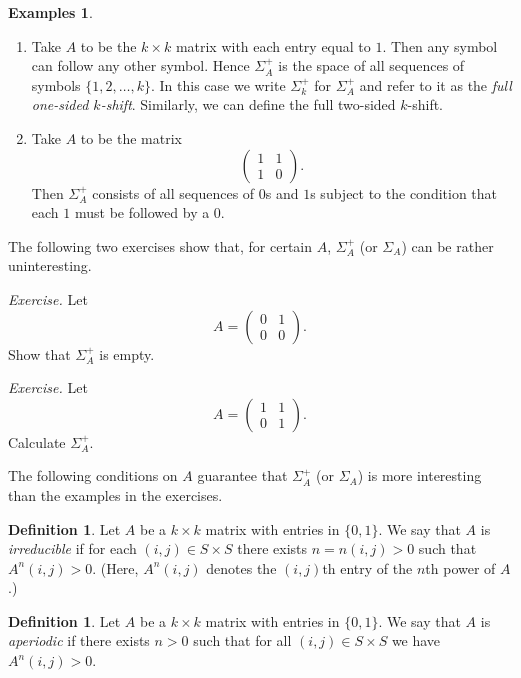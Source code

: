 \documentclass[12pt]{article}
\theoremstyle{definition}
\newtheorem{definition}[theorem]{Definition}
\newtheorem{examples}[theorem]{Examples}
\theoremstyle{remark}
\begin{document}
\begin{examples}
\begin{enumerate}
\item
Take $A$ to be the $k \times k$ matrix with each entry equal to $1$.
Then any symbol can follow any other symbol.  Hence $\Sigma_{A}^{+}$
is the space of all sequences of symbols $\{1,2, \ldots, k\}$.  In
this case we write $\Sigma_{k}^{+}$ for $\Sigma_{A}^{+}$ and refer to
it as the {\it  full one-sided $k$-shift}.  Similarly, we can define
the full two-sided $k$-shift.
\item
Take $A$ to be the matrix
\[
 \left( \begin{array}{cc} 1 & 1 \\ 1 & 0 \end{array} \right).
\]
Then $\Sigma_{A}^{+}$ consists of all sequences of $0$s and $1$s
subject to the condition that each $1$ must be followed by a $0$.
\end{enumerate}
\end{examples}

The following two exercises show that, for certain $A$,
$\Sigma_{A}^{+}$ (or $\Sigma_{A}$) can be rather uninteresting.

\medskip
\noindent
{\it Exercise.}
Let
\[
 A = \left( \begin{array}{cc} 0 & 1 \\ 0 & 0 \end{array} \right).
\]
Show that $\Sigma_{A}^{+}$ is empty.



\medskip
\noindent
{\it Exercise.}
Let
\[
 A = \left( \begin{array}{cc} 1 & 1 \\ 0 & 1 \end{array} \right).
\]
Calculate $\Sigma_{A}^{+}$.

\medskip
The following conditions on $A$ guarantee that $\Sigma_{A}^{+}$ (or
$\Sigma_{A}$) is more interesting than the examples in the exercises.

\begin{definition}
Let $A$ be a $k \times k$ matrix with entries in $\{0,1\}$.  We say
that $A$ is {\it  irreducible} if for each $(i,j) \in S \times S$
there exists $n = n(i,j) > 0$ such that $A^{n}(i,j) > 0$.  (Here,
$A^{n}(i,j)$ denotes the $(i,j)$th entry of the $n$th power of $A$.)
\end{definition}
\begin{definition}
Let $A$ be a $k \times k$ matrix with entries in $\{0,1\}$.  We say
that $A$ is {\it  aperiodic} if there exists $n > 0$ such that for all
$(i,j) \in S \times S$ we have $A^{n}(i,j) > 0$.
\end{definition}
\end{document}
